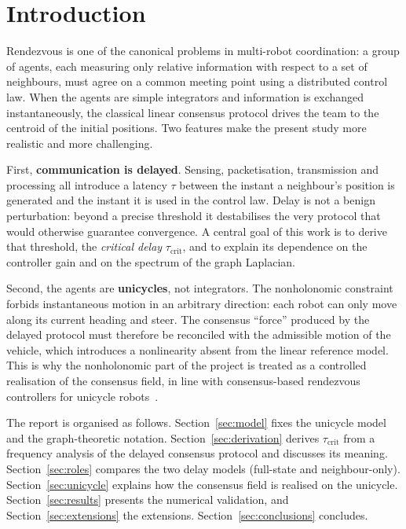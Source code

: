 \documentclass[11pt,a4paper]{article}
\newcommand{\taucrit}{\tau_{\mathrm{crit}}}
\begin{document}
\section{Introduction}

Rendezvous is one of the canonical problems in multi-robot coordination: a group of agents,
each measuring only relative information with respect to a set of neighbours, must agree on a
common meeting point using a distributed control law. When the agents are simple integrators
and information is exchanged instantaneously, the classical linear consensus protocol drives
the team to the centroid of the initial positions. Two features make the present study more
realistic and more challenging.

First, \textbf{communication is delayed}. Sensing, packetisation, transmission and processing
all introduce a latency $\tau$ between the instant a neighbour's position is generated and the
instant it is used in the control law. Delay is not a benign perturbation: beyond a precise
threshold it destabilises the very protocol that would otherwise guarantee convergence. A
central goal of this work is to derive that threshold, the \emph{critical delay} $\taucrit$,
and to explain its dependence on the controller gain and on the spectrum of the graph
Laplacian.

Second, the agents are \textbf{unicycles}, not integrators. The nonholonomic constraint
forbids instantaneous motion in an arbitrary direction: each robot can only move along its
current heading and steer. The consensus ``force'' produced by the delayed protocol must
therefore be reconciled with the admissible motion of the vehicle, which introduces a
nonlinearity absent from the linear reference model. This is why the nonholonomic part of the
project is treated as a controlled realisation of the consensus field, in line with
consensus-based rendezvous controllers for unicycle robots~\cite{listmann2009formation}.

The report is organised as follows. Section~\ref{sec:model} fixes the unicycle model and the
graph-theoretic notation. Section~\ref{sec:derivation} derives $\taucrit$ from a frequency
analysis of the delayed consensus protocol and discusses its meaning. Section~\ref{sec:roles}
compares the two delay models (full-state and neighbour-only). Section~\ref{sec:unicycle}
explains how the consensus field is realised on the unicycle. Section~\ref{sec:results}
presents the numerical validation, and Section~\ref{sec:extensions} the extensions.
Section~\ref{sec:conclusions} concludes.
\end{document}

